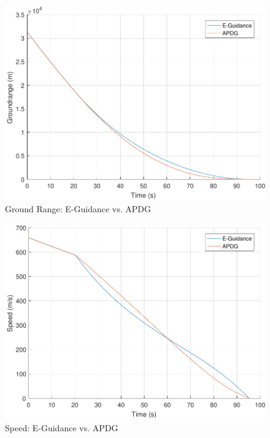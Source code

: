 \begin{figure}[H]
	\centering
	\begin{minipage}{4.3 in}
		\includegraphics[width=\linewidth]{Figures/rngEvsAPDG.pdf}
		\caption{Ground Range: E-Guidance vs. APDG \label{fig:rngEvsAPDG} }
	\end{minipage}
\end{figure}

\begin{figure}[H]
	\centering
	\begin{minipage}{4.3 in}
		\includegraphics[width=\linewidth]{Figures/spdEvsAPDG.pdf}
		\caption{Speed: E-Guidance vs. APDG \label{fig:spdEvsAPDG} }
	\end{minipage}
\end{figure}

